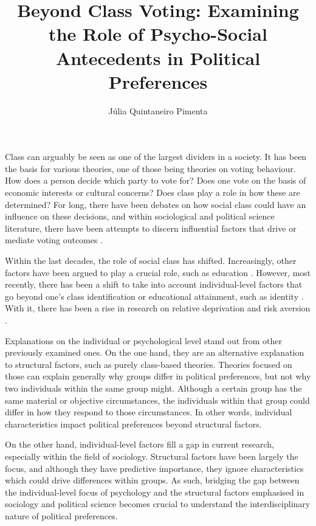 \documentclass[stu,12pt]{apa7}
\title{Beyond Class Voting: Examining the Role of Psycho-Social Antecedents in Political Preferences}
\author{Júlia Quintaneiro Pimenta}
\affiliation{\mbox{Master in the Social Sciences, Universidad Carlos III de Madrid}}
\begin{document}
\maketitle

Class can arguably be seen as one of the largest dividers in a society. It has been the basis for various theories, one of those being theories on voting behaviour. How does a person decide which party to vote for? Does one vote on the basis of economic interests or cultural concerns? Does class play a role in how these are determined? For long, there have been debates on how social class could have an influence on these decisions, and within sociological and political science literature, there have been attempts to discern influential factors that drive or mediate voting outcomes \parencite{PDFSocialClass}.

Within the last decades, the role of social class has shifted. Increasingly, other factors have been argued to play a crucial role, such as education \parencite{hoogheFieldEducationPolitical2025}. However, most recently, there has been a shift to take into account individual-level factors that go beyond one’s class identification or educational attainment, such as identity \parencite{bornschierHowUsThem2021b}. With it, there has been a rise in research on relative deprivation and risk aversion \parencite{cenaRelativeDeprivationNational2023, gartnerIndividualRiskPreferences2017, rooduijnParadoxWellbeingUnfavorable2018a}.

Explanations on the individual or psychological level stand out from other previously examined ones. On the one hand, they are an alternative explanation to structural factors, such as purely class-based theories. Theories focused on those can explain generally why groups differ in political preferences, but not why two individuals within the same group might. Although a certain group has the same material or objective circumstances, the individuals within that group could differ in how they respond to those circumstances. In other words, individual characteristics impact political preferences beyond structural factors.

On the other hand, individual-level factors fill a gap in current research, especially within the field of sociology. Structural factors have been largely the focus, and although they have predictive importance, they ignore characteristics which could drive differences within groups. As such, bridging the gap between the individual-level focus of psychology and the structural factors emphasised in sociology and political science becomes crucial to understand the interdisciplinary nature of political preferences.
\end{document}
